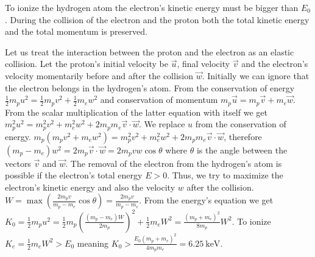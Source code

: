 {\ifEngHint
To ionize the hydrogen atom the electron’s kinetic energy must be bigger than $E_0$. During the collision of the electron and the proton both the total kinetic energy and the total momentum is preserved.
\fi


\ifEngSolution
Let us treat the interaction between the proton and the electron as an elastic collision. Let the proton’s initial velocity be $\vec{u}$, final velocity $\vec{v}$ and the electron’s velocity momentarily before and after the collision $\vec{w}$. Initially we can ignore that the electron belongs in the hydrogen’s atom. From the conservation of energy $\frac{1}{2}m_p u^2 = \frac{1}{2}m_p v^2 + \frac{1}{2}m_e w^2$ and conservation of momentum $m_p \vec{u} = m_p \vec{v} + m_e \vec{w}$. From the scalar multiplication of the latter equation with itself we get $m_p^2 u^2 = m_p^2 v^2 + m_e^2 w^2 + 2 m_p m_e \vec{v}\cdot \vec{w}$. We replace $u$ from the conservation of energy. $m_p ( m_p v^2 + m_e w^2 ) = m_p^2 v^2 + m_e^2 w^2 + 2 m_p m_e \vec{v}\cdot \vec{w}$, therefore $( m_p - m_e ) w^2 = 2 m_p \vec{v}\cdot\vec{w} = 2 m_p vw \cos\theta$ where $\theta$ is the angle between the vectors $\vec{v}$ and $\vec{w}$. The removal of the electron from the hydrogen’s atom is possible if the electron’s total energy $E>0$. Thus, we try to maximize the electron’s kinetic energy and also the velocity $w$ after the collision. $W = \max\left(\frac{2 m_p v}{m_p - m_e}\cos\theta\right) = \frac{2 m_p v}{m_p - m_e}$. From the energy’s equation we get $K_0 = \frac{1}{2}m_p u^2 = \frac{1}{2}m_p \left(\frac{( m_p - m_e ) W}{2 m_p}\right)^2 + \frac{1}{2}m_e W^2 = \frac{(m_p + m_e)^2}{8 m_p} W^2$. To ionize $K_e = \frac{1}{2}m_e W^2 > E_0$ meaning $K_0 > \frac{E_0 (m_p + m_e)^2}{4 m_p m_e} = \SI{6.25}{\kilo\electronvolt}$.
\fi
}
